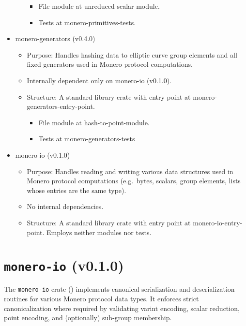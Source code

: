 \documentclass[12pt,a4paper]{article}
\begin{document}
\begin{itemize}
\begin{itemize}
\begin{itemize}
   \item File module at \gls{unreduced-scalar-module}.
   \item Tests at \gls{monero-primitives-tests}.
   \end{itemize}
   \end{itemize}



\item \gls{monero-generators (v0.4.0)}
   \begin{itemize}
   \item Purpose: Handles hashing data to elliptic curve group elements and all fixed generators used in Monero protocol computations.
   \item Internally dependent only on \gls{monero-io (v0.1.0)}.
   \item Structure: A standard library crate with entry point at \gls{monero-generators-entry-point}.
   \begin{itemize}

   \item File module at \gls{hash-to-point-module}.
   \item Tests at \gls{monero-generators-tests}
   \end{itemize}
   \end{itemize}

\item \gls{monero-io (v0.1.0)}
   \begin{itemize}
   \item Purpose: Handles reading and writing various data structures used in Monero protocol computations (e.g.\ bytes, scalars, group elements, lists whose entries are the same type).
   \item No internal dependencies.
   \item Structure: A standard library crate with entry point at \gls{monero-io-entry-point}. Employs neither modules nor tests.
\end{itemize}

\end{itemize}



\section{\texttt{monero-io} (v0.1.0)}
The \texttt{monero-io} crate
()
implements canonical serialization and deserialization routines
for various Monero protocol data types. It enforces strict
canonicalization where required by validating varint encoding,
scalar reduction, point encoding, and (optionally)
sub-group membership.
\end{document}
